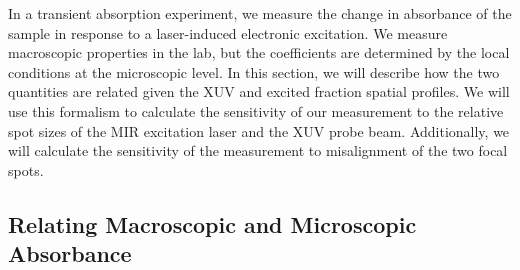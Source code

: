 In a transient absorption experiment, we measure the change in absorbance of the sample in response to a laser-induced electronic excitation. We measure macroscopic properties in the lab, but the coefficients are determined by the local conditions at the microscopic level. In this section, we will describe how the two quantities are related given the XUV and excited fraction spatial profiles. We will use this formalism to calculate the sensitivity of our measurement to the relative spot sizes of the MIR excitation laser and the XUV probe beam. Additionally, we will calculate the sensitivity of the measurement to misalignment of the two focal spots.

\subsection{Relating Macroscopic and Microscopic Absorbance}
\label{sec:micro_macro_DeltaA}

